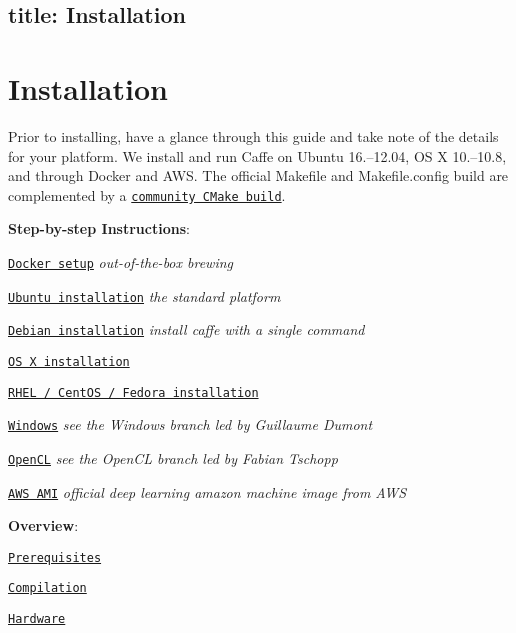

 \subsection*{title\+: Installation }

\section*{Installation}

Prior to installing, have a glance through this guide and take note of the details for your platform. We install and run Caffe on Ubuntu 16.–12.04, OS X 10.–10.8, and through Docker and A\+WS. The official Makefile and {\ttfamily Makefile.\+config} build are complemented by a \href{#cmake-build}{\tt community C\+Make build}.

{\bfseries Step-\/by-\/step Instructions}\+:


\begin{DoxyItemize}
\item \href{https://github.com/BVLC/caffe/tree/master/docker}{\tt Docker setup} {\itshape out-\/of-\/the-\/box brewing}
\item \href{install_apt.html}{\tt Ubuntu installation} {\itshape the standard platform}
\item \href{install_apt_debian.html}{\tt Debian installation} {\itshape install caffe with a single command}
\item \href{install_osx.html}{\tt OS X installation}
\item \href{install_yum.html}{\tt R\+H\+EL / Cent\+OS / Fedora installation}
\item \href{https://github.com/BVLC/caffe/tree/windows}{\tt Windows} {\itshape see the Windows branch led by Guillaume Dumont}
\item \href{https://github.com/BVLC/caffe/tree/opencl}{\tt Open\+CL} {\itshape see the Open\+CL branch led by Fabian Tschopp}
\item \href{https://aws.amazon.com/marketplace/pp/B01M0AXXQB}{\tt A\+WS A\+MI} {\itshape official deep learning amazon machine image from A\+WS}
\end{DoxyItemize}

{\bfseries Overview}\+:


\begin{DoxyItemize}
\item \href{#prerequisites}{\tt Prerequisites}
\item \href{#compilation}{\tt Compilation}
\item \href{#hardware}{\tt Hardware}
\end{DoxyItemize}

